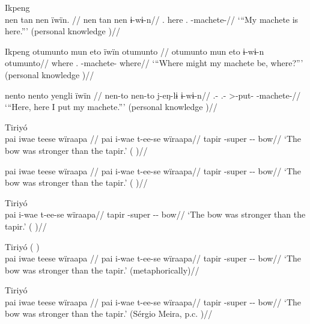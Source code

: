 \documentclass{article}
\begin{document}
\ex  Ikpeng  \\\label{ekiri-13}
\begingl \glpreamble nen tan nen ïwïn. //
\gla nen tan nen ɨ-wɨ-n//
\glb {}. here . -machete-//
\glft ‘“My machete is here.”’ (personal knowledge
)//
\endgl
\xe

\pex Ikpeng    
\a \label{ekiri-9}
\begingl \glpreamble otumunto mun eto ïwïn otumunto //
\gla otumunto mun eto ɨ-wɨ-n otumunto//
\glb where .  -machete- where//
\glft ‘“Where might my machete be, where?”’ (personal knowledge
)//
\endgl

    
\a \label{ekiri-10}
\begingl \glpreamble nento nento yengli ïwïn //
\gla nen-to nen-to j-eŋ-lɨ ɨ-wɨ-n//
\glb {}.- .- >-put- -machete-//
\glft ‘“Here, here I put my machete.”’ (personal knowledge
)//
\endgl

\xe

\ex  Tiriyó  \\\label{tri-1}
\begingl \glpreamble pai iwae teese wïraapa //
\gla pai i-wae t-ee-se wïraapa//
\glb tapir -super -- bow//
\glft ‘The bow was stronger than the tapir.’ (\cite[420]{triomeira1999}
)//
\endgl
\xe

\ex \label{tri-1}
\begingl \glpreamble pai iwae teese wïraapa //
\gla pai i-wae t-ee-se wïraapa//
\glb tapir -super -- bow//
\glft ‘The bow was stronger than the tapir.’ (\cite[420]{triomeira1999}
)//
\endgl
\xe

\ex  Tiriyó  \\\label{tri-1}
\begingl 
\gla pai i-wae t-ee-se wïraapa//
\glb tapir -super -- bow//
\glft ‘The bow was stronger than the tapir.’ (\cite[420]{triomeira1999}
)//
\endgl
\xe

\ex  Tiriyó (\cite[420]{triomeira1999}
) \\\label{tri-1}
\begingl \glpreamble pai iwae teese wïraapa //
\gla pai i-wae t-ee-se wïraapa//
\glb tapir -super -- bow//
\glft ‘The bow was stronger than the tapir.’ (metaphorically)//
\endgl
\xe

\ex  Tiriyó  \\\label{tri-1}
\begingl \glpreamble pai iwae teese wïraapa //
\gla pai i-wae t-ee-se wïraapa//
\glb tapir -super -- bow//
\glft ‘The bow was stronger than the tapir.’ (Sérgio Meira, p.c.
)//
\endgl
\xe
\end{document}
